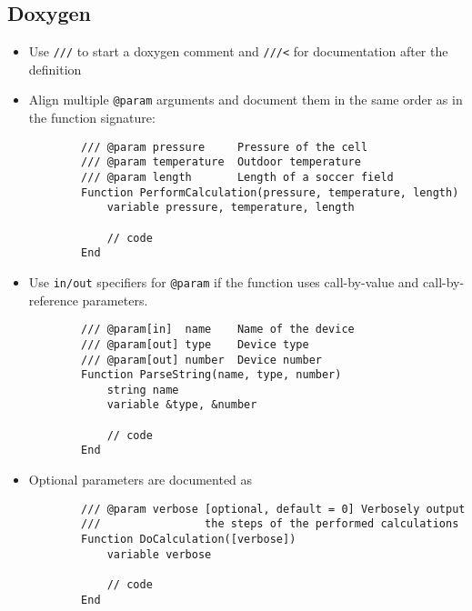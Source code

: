 \documentclass{scrartcl}
\begin{document}
\subsection*{Doxygen}
\begin{itemize}
	\item Use \texttt{///} to start a doxygen comment and \texttt{///<} for documentation after the definition
%	
	\item Align multiple \texttt{@param} arguments and document them in the same order as in the function signature:
	\begin{verbatim}
		/// @param pressure     Pressure of the cell
		/// @param temperature  Outdoor temperature
		/// @param length       Length of a soccer field
		Function PerformCalculation(pressure, temperature, length)
			variable pressure, temperature, length
	
			// code
		End
	\end{verbatim}
%
	\item Use \texttt{in/out} specifiers for \texttt{@param} if the function uses call-by-value and call-by-reference parameters.
	\begin{verbatim}
		/// @param[in]  name    Name of the device
		/// @param[out] type    Device type
		/// @param[out] number  Device number
		Function ParseString(name, type, number)
			string name
			variable &type, &number
			
			// code
		End
	\end{verbatim}
%	
	\item Optional parameters are documented as
	\begin{verbatim}
		/// @param verbose [optional, default = 0] Verbosely output
		///                the steps of the performed calculations
		Function DoCalculation([verbose])
			variable verbose
			
			// code
		End
	\end{verbatim}
\end{itemize}
%
\end{document}
